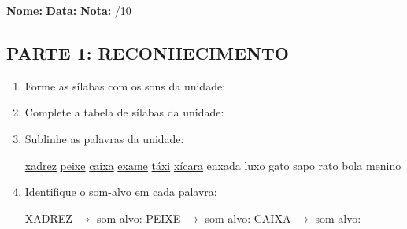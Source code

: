 \begin{exercicio}

\noindent\textbf{Nome:} \underline{\hspace{3.2cm}} \quad \textbf{Data:} \underline{\hspace{1.6cm}} \quad \textbf{Nota:} \underline{\hspace{0.9cm}}/10


\subsection*{PARTE 1: RECONHECIMENTO}

\begin{enumerate}

  \item Forme as sílabas com os sons da unidade:

\begin{center}
\end{center}

  \item Complete a tabela de sílabas da unidade:

\begin{center}
\end{center}

  \item Sublinhe as palavras da unidade:

\begin{center}
  \uline{xadrez} \quad \uline{peixe} \quad \uline{caixa} \quad \uline{exame} \quad \uline{táxi} \quad \uline{xícara} \quad enxada \quad luxo \quad gato \quad sapo \quad rato \quad bola \quad menino
\end{center}

  \item Identifique o som-alvo em cada palavra:
  \begin{center}
  XADREZ $\rightarrow$ som-alvo: \underline{\hspace{1cm}} \quad PEIXE $\rightarrow$ som-alvo: \underline{\hspace{1cm}} \quad CAIXA $\rightarrow$ som-alvo: \underline{\hspace{1cm}}
  \end{center}


\end{enumerate}
\end{exercicio}
